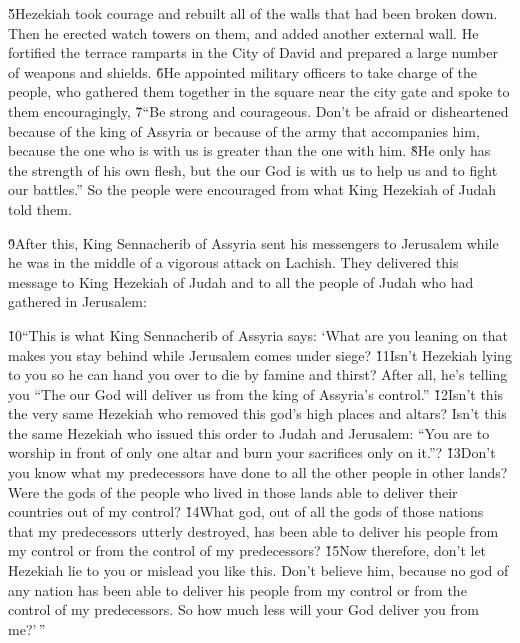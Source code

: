 \v{5}Hezekiah took courage and rebuilt all of the walls that had been broken down. Then he erected watch towers on them, and added another external wall. He fortified the terrace ramparts in the City of David and prepared a large number of weapons and shields. \v{6}He appointed military officers to take charge of the people, who gathered them together in the square near the city gate and spoke to them encouragingly, \v{7}``Be strong and courageous. Don't be afraid or disheartened because of the king of Assyria or because of the army that accompanies him, because the one who is with us is greater than the one with him. \v{8}He only has the strength of his own flesh, but the  our God is with us to help us and to fight our battles.'' So the people were encouraged from what King Hezekiah of Judah told them.

\v{9}After this, King Sennacherib of Assyria sent his messengers to Jerusalem while he was in the middle of a vigorous attack on Lachish. They delivered this message to King Hezekiah of Judah and to all the people of Judah who had gathered in Jerusalem:

\begin{poetry}
\poeml \v{10}``This is what King Sennacherib of Assyria says: `What are you leaning on that makes you stay behind while Jerusalem comes under siege? \v{11}Isn't Hezekiah lying to you so he can hand you over to die by famine and thirst? After all, he's telling you ``The  our God will deliver us from the king of Assyria's control.'' \v{12}Isn't this the very same Hezekiah who removed this god's high places and altars? Isn't this the same Hezekiah who issued this order to Judah and Jerusalem: ``You are to worship in front of only one altar and burn your sacrifices only on it.''? \v{13}Don't you know what my predecessors have done to all the other people in other lands? Were the gods of the people who lived in those lands able to deliver their countries out of my control? \v{14}What god, out of all the gods of those nations that my predecessors utterly destroyed, has been able to deliver his people from my control or from the control of my predecessors? \v{15}Now therefore, don't let Hezekiah lie to you or mislead you like this. Don't believe him, because no god of any nation has been able to deliver his people from my control or from the control of my predecessors. So how much less will your God deliver you from me?'\,''
\end{poetry}

